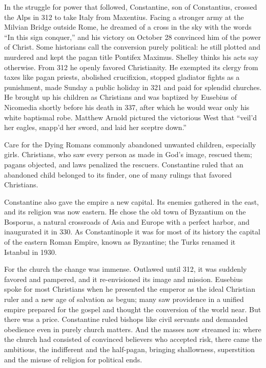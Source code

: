 In the struggle for power that followed, Constantine, son of Constantius, crossed the Alps in 312 to
take Italy from Maxentius. Facing a stronger army at the Milvian Bridge outside Rome, he dreamed of a
cross in the sky with the words ``In this sign conquer,'' and his victory on October 28 convinced him
of the power of Christ. Some historians call the conversion purely political: he still plotted and
murdered and kept the pagan title Pontifex Maximus. Shelley thinks his acts say otherwise. From 312
he openly favored Christianity. He exempted its clergy from taxes like pagan priests, abolished
crucifixion, stopped gladiator fights as a punishment, made Sunday a public holiday in 321 and paid
for splendid churches. He brought up his children as Christians and was baptized by Eusebius of
Nicomedia shortly before his death in 337, after which he would wear only his white baptismal robe.
Matthew Arnold pictured the victorious West that ``veil'd her eagles, snapp'd her sword, and laid her
sceptre down.''

\begin{sidebox}{Care for the Dying}
Romans commonly abandoned unwanted children, especially girls. Christians, who saw every person as
made in God's image, rescued them; pagans objected, and laws penalized the rescuers. Constantine ruled
that an abandoned child belonged to its finder, one of many rulings that favored Christians.
\end{sidebox}

Constantine also gave the empire a new capital. Its enemies gathered in the east, and its religion
was now eastern. He chose the old town of Byzantium on the Bosporus, a natural crossroads of Asia and
Europe with a perfect harbor, and inaugurated it in 330. As Constantinople it was for most of its
history the capital of the eastern Roman Empire, known as Byzantine; the Turks renamed it Istanbul in 1930.

For the church the change was immense. Outlawed until 312, it was suddenly favored and pampered, and
it re-envisioned its image and mission. Eusebius spoke for most Christians when he presented the
emperor as the ideal Christian ruler and a new age of salvation as begun; many saw providence in a
unified empire prepared for the gospel and thought the conversion of the world near. But there was a
price. Constantine ruled bishops like civil servants and demanded obedience even in purely church
matters. And the masses now streamed in: where the church had consisted of convinced believers who
accepted risk, there came the ambitious, the indifferent and the half-pagan, bringing shallowness,
superstition and the misuse of religion for political ends.

